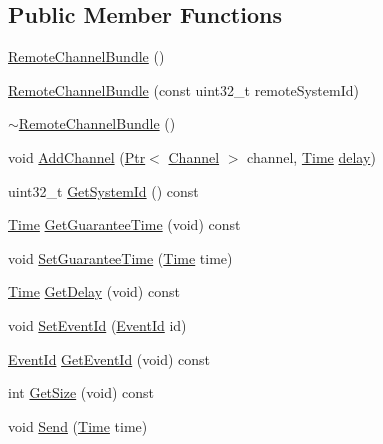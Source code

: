 \subsection*{Public Member Functions}
\begin{DoxyCompactItemize}
\item 
\hyperlink{classns3_1_1RemoteChannelBundle_a623fd876a354e8643516dfbbd17a267d}{Remote\+Channel\+Bundle} ()
\item 
\hyperlink{classns3_1_1RemoteChannelBundle_ad0b48261ddc203ceec2638d2ff462bf1}{Remote\+Channel\+Bundle} (const uint32\+\_\+t remote\+System\+Id)
\item 
\hyperlink{classns3_1_1RemoteChannelBundle_a05c6c262d09634c3e08e1fce48c7b9ec}{$\sim$\+Remote\+Channel\+Bundle} ()
\item 
void \hyperlink{classns3_1_1RemoteChannelBundle_ae158d5774ca037b3bc8ee83f67c26088}{Add\+Channel} (\hyperlink{classns3_1_1Ptr}{Ptr}$<$ \hyperlink{classns3_1_1Channel}{Channel} $>$ channel, \hyperlink{classns3_1_1Time}{Time} \hyperlink{mmwave_2model_2fading-traces_2fading__trace__generator_8m_a7964e6aa8f61a9d28973c8267a606ad8}{delay})
\item 
uint32\+\_\+t \hyperlink{classns3_1_1RemoteChannelBundle_ab4fa92c16eb417c4dcc5f26119c11bdf}{Get\+System\+Id} () const 
\item 
\hyperlink{classns3_1_1Time}{Time} \hyperlink{classns3_1_1RemoteChannelBundle_a9d18b8a62968e980289ed510554a5f98}{Get\+Guarantee\+Time} (void) const 
\item 
void \hyperlink{classns3_1_1RemoteChannelBundle_a2481d753d0c8f592f246a62960efadc0}{Set\+Guarantee\+Time} (\hyperlink{classns3_1_1Time}{Time} time)
\item 
\hyperlink{classns3_1_1Time}{Time} \hyperlink{classns3_1_1RemoteChannelBundle_aee90fa5ba6ea439ee54cb374e676e261}{Get\+Delay} (void) const 
\item 
void \hyperlink{classns3_1_1RemoteChannelBundle_a8b2a3f4f5cd9ab753816a1893ce15818}{Set\+Event\+Id} (\hyperlink{classns3_1_1EventId}{Event\+Id} id)
\item 
\hyperlink{classns3_1_1EventId}{Event\+Id} \hyperlink{classns3_1_1RemoteChannelBundle_ad74b0d8fde644aa001101327fb0dcff4}{Get\+Event\+Id} (void) const 
\item 
int \hyperlink{classns3_1_1RemoteChannelBundle_a8c361ca9d5164ff55befff397f103f63}{Get\+Size} (void) const 
\item 
void \hyperlink{classns3_1_1RemoteChannelBundle_aafe14f486b07e9ae81ab6667de7ddaf3}{Send} (\hyperlink{classns3_1_1Time}{Time} time)
\end{DoxyCompactItemize}
